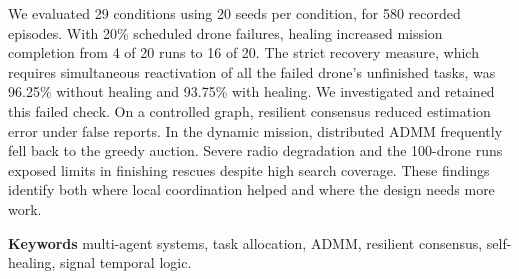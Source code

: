 \documentclass[11pt,a4paper,oneside,openany]{report}
\begin{document}
We evaluated 29 conditions using 20 seeds per condition, for 580 recorded episodes. With 20\% scheduled drone failures, healing increased mission completion from 4 of 20 runs to 16 of 20. The strict recovery measure, which requires simultaneous reactivation of all the failed drone's unfinished tasks, was 96.25\% without healing and 93.75\% with healing. We investigated and retained this failed check. On a controlled graph, resilient consensus reduced estimation error under false reports. In the dynamic mission, distributed ADMM frequently fell back to the greedy auction. Severe radio degradation and the 100-drone runs exposed limits in finishing rescues despite high search coverage. These findings identify both where local coordination helped and where the design needs more work.

\vspace{4mm}
\textbf{Keywords} \quad multi-agent systems, task allocation, ADMM, resilient consensus, self-healing, signal temporal logic.

\tableofcontents
\clearpage
{}







\appendix

\clearpage
\renewcommand{\bibname}{References}

\end{document}
